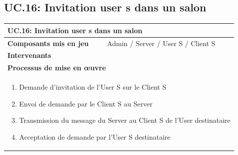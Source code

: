 \documentclass[a4paper,11pt,french]{article}
\begin{document}
\subsection{UC.16: Invitation user s dans un salon}
\begin{center}
	\vspace*{0.7cm}
	\begin{tabularx}{16cm}{|l|X|}
	\hline
	\multicolumn{2}{|l|}{\textbf{UC.16: Invitation user s dans un salon}}\\
	\hline
	\textbf{Composants mis en jeu} & Admin / Server / User S / Client S \\
	\hline
	\textbf{Intervenants} &  \\
	\hline
	\multicolumn{2}{|l|}{\textbf{Processus de mise en \oe uvre}}\\
	\hline
	\multicolumn{2}{|p{15cm}|}{\begin{enumerate}\item Demande d'invitation de l'User S sur le Client S \item Envoi de demande par le Client S au Server \item  Transmission du message du Server au Client S de l'User destinataire \item Acceptation de demande par l'User S destinataire \end{enumerate}}\\
	\hline
	\end{tabularx}
\end{center}

\end{document}
